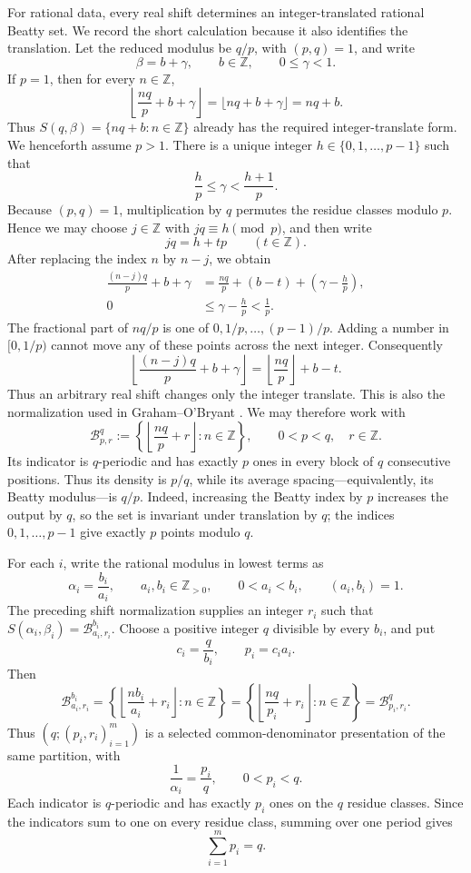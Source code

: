 \documentclass[11pt]{article}
\theoremstyle{definition}
\theoremstyle{remark}
\newcommand{\Z}{\mathbb Z}
\newcommand{\B}{\mathcal B}
\begin{document}
For rational data, every real shift determines an integer-translated rational
Beatty set.  We record the short calculation because it also identifies the
translation.  Let the reduced modulus be \(q/p\), with \((p,q)=1\), and
write
\[
 \beta=b+\gamma,\qquad b\in\Z,\qquad 0\le\gamma<1.
\]
If \(p=1\), then for every \(n\in\Z\),
\[
 \left\lfloor\frac{nq}{p}+b+\gamma\right\rfloor
 =\lfloor nq+b+\gamma\rfloor=nq+b.
\]
Thus \(S(q,\beta)=\{nq+b:n\in\Z\}\) already has the required
integer-translate form.  We henceforth assume \(p>1\).
There is a unique integer \(h\in\{0,1,\ldots,p-1\}\) such that
\[
 \frac hp\le\gamma<\frac{h+1}{p}.
\]
Because \((p,q)=1\), multiplication by \(q\) permutes the residue classes
modulo \(p\).  Hence we may choose \(j\in\Z\) with
\(jq\equiv h\pmod p\), and then write
\[
 jq=h+tp\qquad(t\in\Z).
\]
After replacing the index \(n\) by \(n-j\), we obtain
\begin{align*}
 \frac{(n-j)q}{p}+b+\gamma
 &=\frac{nq}{p}+(b-t)+\left(\gamma-\frac hp\right),\\
 0&\le\gamma-\frac hp<\frac1p.
\end{align*}
The fractional part of \(nq/p\) is one of
\(0,1/p,\ldots,(p-1)/p\).  Adding a number in \([0,1/p)\) cannot move any
of these points across the next integer.  Consequently
\[
 \left\lfloor\frac{(n-j)q}{p}+b+\gamma\right\rfloor
 =\left\lfloor\frac{nq}{p}\right\rfloor+b-t.
\]
Thus an arbitrary real shift changes only the integer translate.  This is
also the normalization used in Graham--O'Bryant
\cite[p.~284, footnote~1]{GrahamOBryant2005}.  We may therefore work with
\[
 \B^q_{p,r}:=\left\{\left\lfloor\frac{nq}{p}+r\right\rfloor:n\in\Z\right\},
 \qquad 0<p<q,\quad r\in\Z.
\]
Its indicator is \(q\)-periodic and has exactly \(p\) ones in every block
of \(q\) consecutive positions.  Thus its density is \(p/q\), while its
average spacing---equivalently, its Beatty modulus---is \(q/p\).
Indeed, increasing the Beatty index by \(p\) increases the output by \(q\),
so the set is invariant under translation by \(q\); the indices
\(0,1,\ldots,p-1\) give exactly \(p\) points modulo \(q\).

For each \(i\), write the rational modulus in lowest terms as
\[
 \alpha_i=\frac{b_i}{a_i},\qquad
 a_i,b_i\in\Z_{>0},\qquad 0<a_i<b_i,\qquad (a_i,b_i)=1.
\]
The preceding shift normalization supplies an integer \(r_i\) such that
\(S(\alpha_i,\beta_i)=\B^{b_i}_{a_i,r_i}\).  Choose a positive integer
\(q\) divisible by every \(b_i\), and put
\[
 c_i=\frac q{b_i},\qquad p_i=c_i a_i.
\]
Then
\[
 \B^{b_i}_{a_i,r_i}
 =\left\{\left\lfloor\frac{nb_i}{a_i}+r_i\right\rfloor:n\in\Z\right\}
 =\left\{\left\lfloor\frac{nq}{p_i}+r_i\right\rfloor:n\in\Z\right\}
 =\B^q_{p_i,r_i}.
\]
Thus \((q;(p_i,r_i)_{i=1}^m)\) is a selected common-denominator
presentation of the same partition, with
\[
 \frac1{\alpha_i}=\frac{p_i}{q},\qquad 0<p_i<q.
\]
Each indicator is \(q\)-periodic and has exactly \(p_i\) ones on the
\(q\) residue classes.  Since the indicators sum to one on every residue
class, summing over one period gives
\[
 \sum_{i=1}^m p_i=q.
\]
\end{document}
